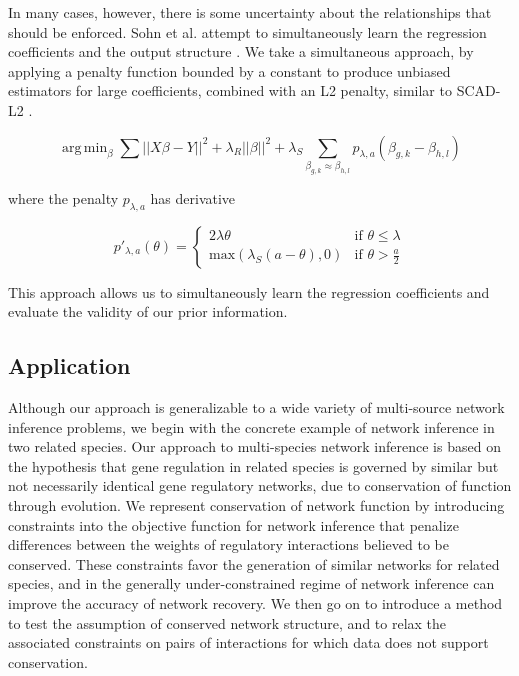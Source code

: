 \documentclass[11pt]{article}
\DeclareMathOperator*{\argmin}{arg\,min}
\begin{document}
In many cases, however, there is some uncertainty about the relationships that should be enforced. Sohn et al. attempt to simultaneously learn the regression coefficients and the output structure \cite{sohn_joint_2012}. We take a simultaneous approach, by applying a penalty function bounded by a constant to produce unbiased estimators for large coefficients, combined with an L2 penalty, similar to SCAD-L2 \cite{Zeng2012}. 

\begin{equation}
\argmin_{\beta} \displaystyle\sum \vert \vert X\beta - Y \vert \vert ^2 + \lambda_R \vert \vert \beta \vert \vert ^2 + \displaystyle \lambda_S  \displaystyle \sum_{\beta_{g,k} \approx \beta_{h,l}} p_{\lambda, a} (\beta_{g,k} - \beta_{h,l})
\end{equation}

where the penalty $p_{\lambda, a}$ has derivative 

\begin{equation}
p'_{\lambda,a}(\theta) = \left\{
    \begin{array}{lr}
    2\lambda\theta & \text{if } \theta \leq \lambda\\
    \text{max}(\lambda_S(a-\theta),0) & \text{if } \theta > \frac{a}{2}
    \end{array}
    \right.
\end{equation}

 This approach allows us to simultaneously learn the regression coefficients and evaluate the validity of our prior information. 

\subsection{Application}
Although our approach is generalizable to a wide variety of multi-source network inference problems, we begin with the concrete example of network inference in two related species. Our approach to multi-species network inference is based on the hypothesis that gene regulation in related species is governed by similar but not necessarily identical gene regulatory networks, due to conservation of function through evolution. We represent conservation of network function by introducing constraints into the objective function for network inference that penalize differences between the weights of regulatory interactions believed to be conserved. These constraints favor the generation of similar networks for related species, and in the generally under-constrained regime of network inference can improve the accuracy of network recovery. We then go on to introduce a method to test the assumption of conserved network structure, and to relax the associated constraints on pairs of interactions for which data does not support conservation.
\end{document}
